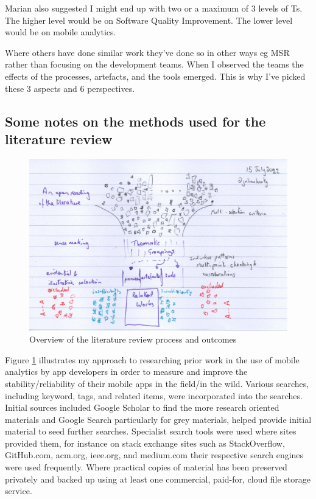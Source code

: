 Marian also suggested I might end up with two or a maximum of 3 levels of Ts. The higher level would be on Software Quality Improvement. The lower level would be on mobile analytics.

Where others have done similar work they've done so in other ways eg MSR rather than focusing on the development teams. When I observed the teams the effects of the processes, artefacts, and the tools emerged. This is why I've picked these 3 aspects and 6 perspectives. 

\subsection*{Some notes on the methods used for the literature review}

\begin{figure}
    \centering
    \includegraphics[width=\textwidth]{images/rough-sketches/literature-review-overview.jpeg}
    \caption{Overview of the literature review process and outcomes}
    \label{fig:literature-review-overview}
\end{figure}

Figure \ref{fig:literature-review-overview} illustrates my approach to researching prior work in the use of mobile analytics by app developers in order to measure and improve the stability/reliability of their mobile apps in the field/in the wild. Various searches, including keyword, tags, and related items, were incorporated into the searches. Initial sources included Google Scholar to find the more research oriented materials and Google Search particularly for grey materials, helped provide initial material to seed further searches. Specialist search tools were used where sites provided them, for instance on stack exchange sites such as StackOverflow, GitHub.com, acm.org, ieee.org, and medium.com their respective search engines were used frequently. Where practical copies of material has been preserved privately and backed up using at least one commercial, paid-for, cloud file storage service.

